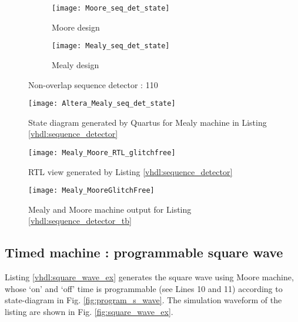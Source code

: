 \begin{figure*}[!h]
	\begin{subfigure}[t]{0.5\textwidth}
		\centering
		\texttt{[image: Moore\_seq\_det\_state]}
		\caption{Moore design}
		
	\end{subfigure} %
	\begin{subfigure}[t]{0.5\textwidth}
		\centering
		\texttt{[image: Mealy\_seq\_det\_state]}
		\caption{Mealy design}
		\label{subfig:Mealy_seq_det_state}
	\end{subfigure}		
	\caption{Non-overlap sequence detector : 110}
	\label{fig:non-overlap-design}%
\end{figure*}

\begin{figure}[!h]
	\centering
	\texttt{[image: Altera\_Mealy\_seq\_det\_state]}
	\caption{State diagram generated by Quartus for Mealy machine in Listing \ref{vhdl:sequence_detector}}
	\label{fig:Altera_Mealy_seq_det_state}
\end{figure}


\begin{figure}[!h]
	\centering
	\texttt{[image: Mealy\_Moore\_RTL\_glitchfree]}
	\caption{RTL view generated by Listing \ref{vhdl:sequence_detector}}
	\label{fig:Mealy_Moore_RTL_glitchfree}
\end{figure}

\begin{figure}[!h]
	\centering
	\texttt{[image: Mealy\_MooreGlitchFree]}
	\caption{Mealy and Moore machine output for Listing \ref{vhdl:sequence_detector_tb}}
	\label{fig:Mealy_MooreGlitchFree}
\end{figure}





\subsection{Timed machine : programmable square wave }
Listing \ref{vhdl:square_wave_ex} generates the square wave using Moore machine, whose `on' and `off' time is programmable (see Lines 10 and 11) according to state-diagram in Fig. \ref{fig:program_s_wave}.  The simulation waveform of the listing are shown in Fig. \ref{fig:square_wave_ex}.

